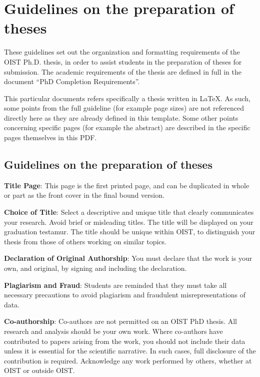 
\chapter{Guidelines on the preparation of theses} \label{ch-1}

These guidelines set out the organization and formatting requirements of the OIST Ph.D. thesis, in order to assist students in the preparation of theses for submission. The academic requirements of the thesis are defined in full in the document ``PhD Completion Requirements''.

This particular documents refers specifically a thesis written in \LaTeX. As such, some points from the full guideline (for example page sizes) are not referenced directly here as they are already defined in this template. Some other points concerning specific pages (for example the abstract) are described in the specific pages themselves in this PDF.

\section{Guidelines on the preparation of theses}

\textbf{Title Page}:  This page is the first printed page, and can be duplicated in whole or part as the front cover in the final bound version.

\textbf{Choice of Title}: Select a descriptive and unique title that clearly communicates your research.  Avoid brief or misleading titles.  The title will be displayed on your graduation testamur.  The title should be unique within OIST, to distinguish your thesis from those of others working on similar topics.

\textbf{Declaration of Original Authorship}:  You must declare that the work is your own, and original,  by signing and including the declaration.

\textbf{Plagiarism and Fraud}:  Students are reminded that they must take all necessary precautions to avoid plagiarism and fraudulent misrepresentations of data.

\textbf{Co-authorship}:  Co-authors are not permitted on an OIST PhD thesis. All research and analysis should be your own work. Where co-authors have contributed to papers arising from the work, you should not include their data unless it is essential for the scientific narrative.  In such cases, full disclosure of the contribution is required. Acknowledge any work performed by others, whether at OIST or outside OIST.

